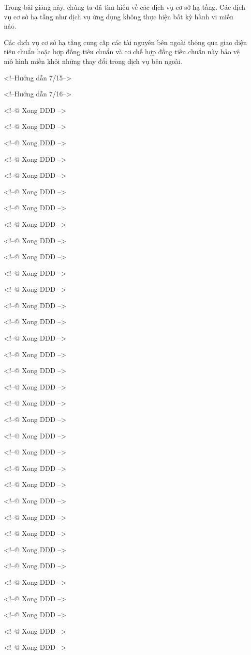 Trong bài giảng này, chúng ta đã tìm hiểu về các dịch vụ cơ sở hạ tầng. Các dịch vụ cơ sở hạ tầng như dịch vụ ứng dụng không thực hiện bất kỳ hành vi miền nào.

Các dịch vụ cơ sở hạ tầng cung cấp các tài nguyên bên ngoài thông qua giao diện tiêu chuẩn hoặc hợp đồng tiêu chuẩn và cơ chế hợp đồng tiêu chuẩn này bảo vệ mô hình miền khỏi những thay đổi trong dịch vụ bên ngoài.

<!--Hướng dẫn 7/15-->

<!--Hướng dẫn 7/16-->

<!--@ Xong DDD -->

<!--@ Xong DDD -->

<!--@ Xong DDD -->

<!--@ Xong DDD -->

<!--@ Xong DDD -->

<!--@ Xong DDD -->

<!--@ Xong DDD -->

<!--@ Xong DDD -->

<!--@ Xong DDD -->

<!--@ Xong DDD -->

<!--@ Xong DDD -->

<!--@ Xong DDD -->

<!--@ Xong DDD -->

<!--@ Xong DDD -->


<!--@ Xong DDD -->

<!--@ Xong DDD -->

<!--@ Xong DDD -->

<!--@ Xong DDD -->

<!--@ Xong DDD -->

<!--@ Xong DDD -->

<!--@ Xong DDD -->

<!--@ Xong DDD -->

<!--@ Xong DDD -->

<!--@ Xong DDD -->

<!--@ Xong DDD -->

<!--@ Xong DDD -->

<!--@ Xong DDD -->

<!--@ Xong DDD -->

<!--@ Xong DDD -->

<!--@ Xong DDD -->

<!--@ Xong DDD -->

<!--@ Xong DDD -->

<!--@ Xong DDD -->

<!--@ Xong DDD -->

